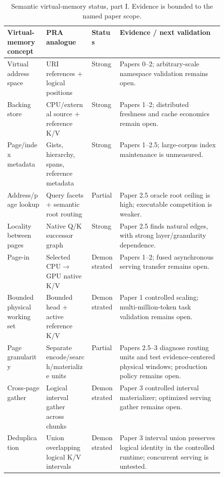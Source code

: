 \documentclass[11pt]{article}
\begin{document}
\begin{table}[p]
\centering
\scriptsize
\caption{Semantic virtual-memory status, part I.  Evidence is bounded to the named paper scope.}
\label{tab:vm-status-a}
\begin{tabularx}{\textwidth}{@{}p{0.18\linewidth}p{0.21\linewidth}p{0.13\linewidth}X@{}}
\toprule
Virtual-memory concept & PRA analogue & Status & Evidence / next validation \\
\midrule
Virtual address space & URI references + logical positions & Strong & Papers 0--2; arbitrary-scale namespace validation remains open. \\
Backing store & CPU/external source + reference K/V & Strong & Papers 1--2; distributed freshness and cache economics remain open. \\
Page/index metadata & Gists, hierarchy, spans, reference metadata & Strong & Papers 1--2.5; large-corpus index maintenance is unmeasured. \\
Address/page lookup & Query facets + semantic root routing & Partial & Paper 2.5 oracle root ceiling is high; executable competition is weaker. \\
Locality between pages & Native Q/K successor graph & Strong & Paper 2.5 finds natural edges, with strong layer/granularity dependence. \\
Page-in & Selected CPU$\rightarrow$GPU native K/V & Demonstrated & Papers 1--2; fused asynchronous serving transfer remains open. \\
Bounded physical working set & Bounded head + active reference K/V & Demonstrated & Paper 1 controlled scaling; multi-million-token task validation remains open. \\
Page granularity & Separate encode/search/materialize units & Partial & Papers 2.5--3 diagnose routing units and test evidence-centered physical windows; production policy remains open. \\
Cross-page gather & Logical interval gather across chunks & Demonstrated & Paper 3 controlled interval materializer; optimized serving gather remains open. \\
Deduplication & Union overlapping logical K/V intervals & Demonstrated & Paper 3 interval union preserves logical identity in the controlled runtime; concurrent serving is untested. \\
\bottomrule
\end{tabularx}
\end{table}
\end{document}
